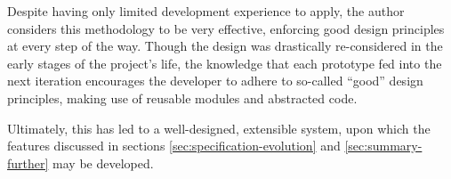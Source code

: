 Despite having only limited development experience to apply, the author
considers this methodology to be very effective, enforcing good design
principles at every step of the way. Though the design was drastically
re-considered in the early stages of the project's life, the knowledge that
each prototype fed into the next iteration encourages the developer to adhere
to so-called ``good'' design principles, making use of reusable modules and
abstracted code.

Ultimately, this has led to a well-designed, extensible system, upon which the
features discussed in sections \ref{sec:specification-evolution} and
\ref{sec:summary-further} may be developed.
